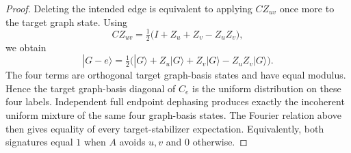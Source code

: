 \documentclass[11pt]{article}
\theoremstyle{remark}
\begin{document}
\begin{proof}
Deleting the intended edge is equivalent to applying $CZ_{uv}$ once more to the target graph state. Using
\[
CZ_{uv}=\tfrac12\big(I+Z_u+Z_v-Z_uZ_v\big),
\]
we obtain
\[
|G-e\rangle=\tfrac12\big(|G\rangle+Z_u|G\rangle+Z_v|G\rangle-Z_uZ_v|G\rangle\big).
\]
The four terms are orthogonal target graph-basis states and have equal modulus. Hence the target graph-basis diagonal of $C_e$ is the uniform distribution on these four labels. Independent full endpoint dephasing produces exactly the incoherent uniform mixture of the same four graph-basis states. The Fourier relation above then gives equality of every target-stabilizer expectation. Equivalently, both signatures equal $1$ when $A$ avoids $u,v$ and $0$ otherwise.
\end{proof}
\end{document}
